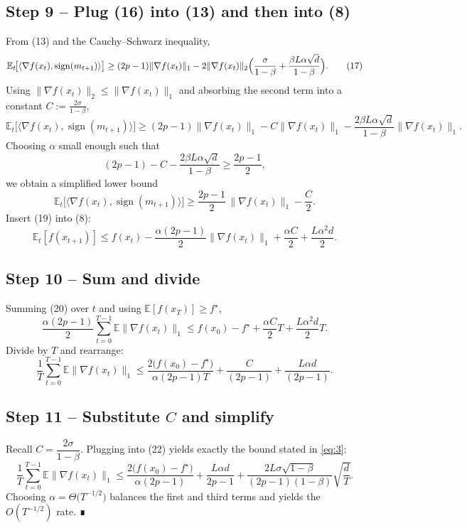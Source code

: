 \documentclass{article}
\begin{document}
\subsection*{Step 9 – Plug (16) into (13) and then into (8)}
From (13) and the Cauchy–Schwarz inequality,
\[
\mathbb{E}_t\!\bigl[\langle\nabla f(x_t),\operatorname{sign}(m_{t+1})\rangle\bigr]
\ge (2p-1)\|\nabla f(x_t)\|_{1}
-2\|\nabla f(x_t)\|_{2}
\Bigl(\frac{\sigma}{1-\beta}+ \frac{\beta L\alpha\sqrt{d}}{1-\beta}\Bigr). \tag{17}
\]
Using $\|\nabla f(x_t)\|_{2}\le\|\nabla f(x_t)\|_{1}$ and absorbing the second term into a constant $C:=\frac{2\sigma}{1-\beta}$,
\[
\mathbb{E}_t\!\bigl[\langle\nabla f(x_t),\operatorname{sign}(m_{t+1})\rangle\bigr]
\ge (2p-1)\|\nabla f(x_t)\|_{1}
- C\|\nabla f(x_t)\|_{1}
-\frac{2\beta L\alpha\sqrt{d}}{1-\beta}\|\nabla f(x_t)\|_{1}. \tag{18}
\]
Choosing $\alpha$ small enough such that
\[
(2p-1)-C-\frac{2\beta L\alpha\sqrt{d}}{1-\beta}\ge\frac{2p-1}{2},
\]
we obtain a simplified lower bound
\[
\mathbb{E}_t\!\bigl[\langle\nabla f(x_t),\operatorname{sign}(m_{t+1})\rangle\bigr]
\ge \frac{2p-1}{2}\,\|\nabla f(x_t)\|_{1}
-\frac{C}{2}. \tag{19}
\]
Insert (19) into (8):
\[
\mathbb{E}_t[f(x_{t+1})]\le f(x_t)
-\frac{\alpha(2p-1)}{2}\|\nabla f(x_t)\|_{1}
+\frac{\alpha C}{2}
+\frac{L\alpha^{2}d}{2}. \tag{20}
\]

\subsection*{Step 10 – Sum and divide}
Summing (20) over $t$ and using $\mathbb{E}[f(x_T)]\ge f^\star$,
\[
\frac{\alpha(2p-1)}{2}\sum_{t=0}^{T-1}\mathbb{E}\|\nabla f(x_t)\|_{1}
\le f(x_0)-f^\star
+\frac{\alpha C}{2}T
+\frac{L\alpha^{2}d}{2}T . \tag{21}
\]
Divide by $T$ and rearrange:
\[
\frac{1}{T}\sum_{t=0}^{T-1}\mathbb{E}\|\nabla f(x_t)\|_{1}
\le
\frac{2\bigl(f(x_0)-f^\star\bigr)}{\alpha(2p-1)T}
+\frac{C}{(2p-1)}
+\frac{L\alpha d}{(2p-1)} . \tag{22}
\]

\subsection*{Step 11 – Substitute $C$ and simplify}
Recall $C=\dfrac{2\sigma}{1-\beta}$.
Plugging into (22) yields exactly the bound stated in \eqref{eq:3}:
\[
\frac{1}{T}\sum_{t=0}^{T-1}\mathbb{E}\|\nabla f(x_t)\|_{1}
\le
\frac{2\bigl(f(x_0)-f^\star\bigr)}{\alpha(2p-1)}
+\frac{L\alpha d}{2p-1}
+\frac{2L\sigma\sqrt{1-\beta}}{(2p-1)(1-\beta)}\sqrt{\frac{d}{T}} .
\]
Choosing $\alpha = \Theta\bigl(T^{-1/2}\bigr)$ balances the first and third terms and yields the $O(T^{-1/2})$ rate.  ∎
\end{document}
